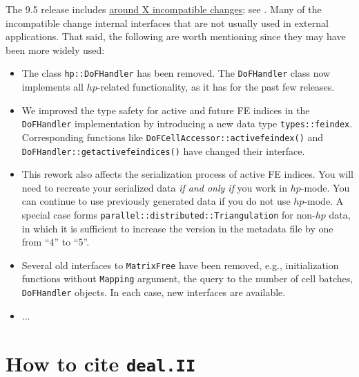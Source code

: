 \documentclass{ansarticle-preprint}
\newcommand{\specialword}[1]{\texttt{#1}}
\newcommand{\dealii}{{\specialword{deal.II}}\xspace}
\begin{document}
The 9.5 release includes
\href{https://dealii.org/developer/doxygen/deal.II/changes_between_9_4_2_and_9_5_0.html}
{around X incompatible changes}; see \cite{changes95}. Many of the
incompatible change internal
interfaces that are not usually used in external
applications. That said, the following are worth mentioning since they
may have been more widely used:
\begin{itemize}
  \item
  The class \texttt{hp::DoFHandler} has been removed. The
  \texttt{DoFHandler} class now implements all $hp$-related
  functionality, as it has for the past few releases.

  \item
  We improved the type safety for active and future FE indices in the \texttt{DoFHandler} implementation by introducing a new data type \texttt{types::fe\textunderscore{}index}. Corresponding functions like \texttt{DoFCellAccessor::active\textunderscore{}fe\textunderscore{}index()} and \texttt{DoFHandler::get\textunderscore{}active\textunderscore{}fe\textunderscore{}indices()} have changed their interface.

  \item
  This rework also affects the serialization process of active FE indices. You will need to recreate your serialized data \textit{if and only if} you work in $hp$-mode. You can continue to use previously generated data if you do not use $hp$-mode. A special case forms \texttt{parallel::distributed::Triangulation} for non-$hp$ data, in which it is sufficient to increase the version in the metadata file by one from ``4'' to ``5''.

\item Several old interfaces to \texttt{MatrixFree} have been removed, e.g.,
  initialization functions without \texttt{Mapping} argument, the query
  to the number of cell batches, \texttt{DoFHandler} objects. In
  each case, new interfaces are available.

\item
  ...
\end{itemize}



\section{How to cite \dealii}\label{sec:cite}
\end{document}
